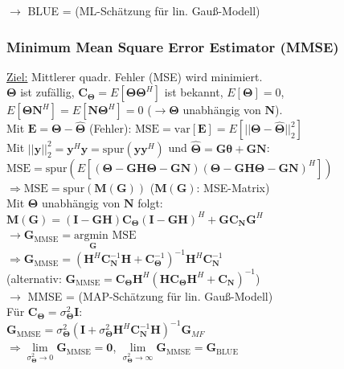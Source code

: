 \documentclass[a4paper,landscape,6pt]{article}
\newcommand{\ma}[1]{\ensuremath{\boldsymbol {#1}}}								%
\renewcommand{\vec}[1]{\ensuremath{\boldsymbol {#1}}}							%
\newcommand{\ul}[1]{\underline{#1}}
\begin{document}
\begin{multicols}{3}
$\rightarrow$ BLUE = (ML-Schätzung für lin. Gauß-Modell)
\subsubsection*{Minimum Mean Square Error Estimator (MMSE)}
\ul{Ziel:} Mittlerer quadr. Fehler (MSE) wird minimiert.\\
$\vec \Theta$ ist zufällig, $\ma C_{\vec \Theta} = E[\vec \Theta \vec \Theta ^H]$ ist bekannt, $E[\vec \Theta] = 0$, $E[\vec \Theta \vec N ^H] = E[\vec N \vec \Theta ^H] = 0$ ($\rightarrow \vec \Theta$ unabhängig von $\vec N$).\\

Mit $\vec E = \vec \Theta - \hat{\vec \Theta}$ (Fehler): $\boxed{\text{MSE} = \text{var}[\vec E] = E[||\vec \Theta - \hat{\vec \Theta}||_2^2]}$\\
Mit $||\vec y||_2^2 = \vec y^H \vec y = \text{spur}(\vec y \vec y^H)$ und $\hat{\vec \Theta} = \ma G \vec \theta + \ma G \vec N$:\\

$\text{MSE} = \text{spur}(E[(\vec \Theta - \ma G \ma H \vec \Theta - \ma G \vec N)(\vec \Theta - \ma G \ma H \vec \Theta - \ma G \vec N)^H])$\\
$\Rightarrow \boxed{ \text{MSE} = \text{spur}(\ma M (\ma G))}$ \tab  ($\ma M (\ma G)$: MSE-Matrix)\\

Mit $\vec \Theta$ unabhängig von $\vec N$ folgt:\\ $\ma M (\ma G) = (\ma I - \ma G \ma H )\ma C_{\vec \Theta}(\ma I - \ma G \ma H )^H + \ma G \ma C_{\vec N} \ma G ^H$\\
$\rightarrow \ma G_{\text{MMSE}} = \underset{\ma G}{\text{argmin }} \text{MSE}$\\

$ \Rightarrow \boxed{\ma G_{\text{MMSE}} = (\ma H^H\ma C_{\vec N}^{-1} \ma H + \ma C_{\vec \Theta}^{-1})^{-1}\ma H^H \ma C_{\vec N}^{-1}}$\\

(alternativ: $\ma G_{\text{MMSE}} = \ma C_{\vec \Theta} \ma H^H (\ma H\ma C_{\vec \Theta}\ma H^H + \ma C_{\vec N})^{-1}$)\\
$\rightarrow$ MMSE = (MAP-Schätzung für lin. Gauß-Modell)\\

Für $\ma C_{\vec \Theta} = \sigma_{\vec \Theta}^2 \ma I$:\\
$\ma G_{\text{MMSE}} = \sigma_{\vec \Theta}^2 (\ma I +\sigma_{\vec \Theta}^2 \ma H^H\ma C_{\vec N}^{-1} \ma H)^{-1}\ma G_{MF}$ \\
$\Rightarrow \lim\limits_{\sigma_{\vec \Theta}^2 \rightarrow 0} \ma G_{\text{MMSE}} = \vec 0$, \tab $\lim\limits_{\sigma_{\vec \Theta}^2 \rightarrow \infty} \ma G_{\text{MMSE}} = \ma G_{\text{BLUE}}$\\


\end{multicols}
\end{document}
